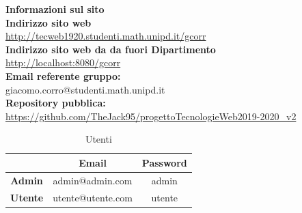\begin{center}
	\textbf{\Large{Informazioni sul sito}}\\
	\textbf{Indirizzo sito web} \\ \url{http://tecweb1920.studenti.math.unipd.it/gcorr}\\
	\textbf{Indirizzo sito web da da fuori Dipartimento} \\ \url{http://localhost:8080/gcorr}\\
	\textbf{Email referente gruppo:} \\ giacomo.corro@studenti.math.unipd.it \\
	\textbf{Repository pubblica:} \\ \url{https://github.com/TheJack95/progettoTecnologieWeb2019-2020_v2}\\
	\renewcommand{\arraystretch}{1.8}
	\begin{longtable}[H]{c c c}
		\caption{Utenti}\\
		\rowcolor[HTML]{F1AB00}
		\multicolumn{1}{c}{\color[HTML]{FFFFFF} \textbf{Utente}} &
		\multicolumn{1}{c}{\color[HTML]{FFFFFF} \textbf{Email}} &
		\multicolumn{1}{c}{\color[HTML]{FFFFFF} \textbf{Password}} \\
		\endhead
		\textbf{Admin} & admin@admin.com & admin\\
		\textbf{Utente} & utente@utente.com & utente\\
	\end{longtable}
\end{center}